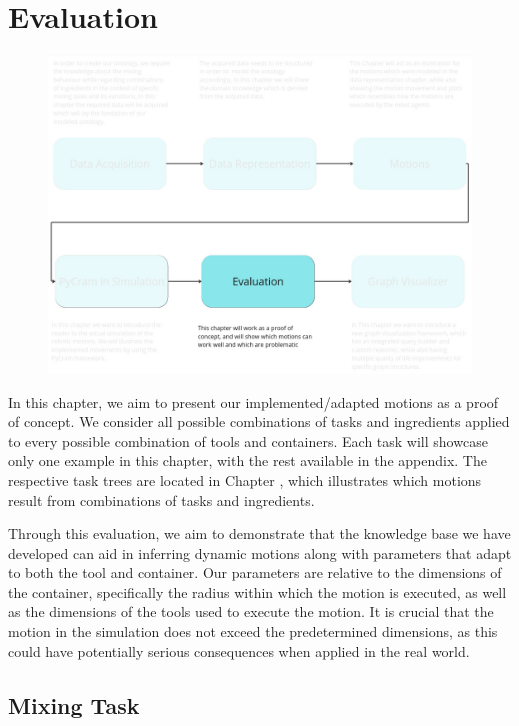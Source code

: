\chapter{Evaluation}
\begin{figure}[H]
  \includegraphics[scale=0.3]{Graphics/overview_5.jpg}
\end{figure}
In this chapter, we aim to present our implemented/adapted motions as a proof of concept. We consider all possible combinations of tasks and ingredients applied to every possible combination of tools and containers. Each task will showcase only one example in this chapter, with the rest available in the appendix. The respective task trees are located in Chapter , which illustrates which motions result from combinations of tasks and ingredients.

Through this evaluation, we aim to demonstrate that the knowledge base we have developed can aid in inferring dynamic motions along with parameters that adapt to both the tool and container. Our parameters are relative to the dimensions of the container, specifically the radius within which the motion is executed, as well as the dimensions of the tools used to execute the motion. It is crucial that the motion in the simulation does not exceed the predetermined dimensions, as this could have potentially serious consequences when applied in the real world.
\section{Mixing Task}

